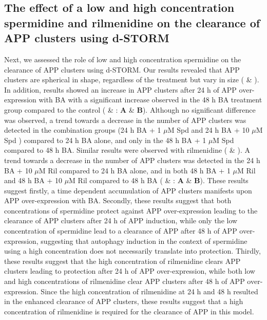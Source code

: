 \subsection{The effect of a low and high concentration spermidine and rilmenidine on the clearance of APP clusters using d-STORM}

Next, we assessed the role of low and high concentration spermidine on the clearance of APP clusters using d-STORM. Our results revealed that APP clusters are spherical in shape, regardless of the treatment but vary in size ( \& ). In addition, results showed an increase in APP clusters after 24 h of APP over-expression with BA with a significant increase observed in the 48 h BA treatment group compared to the control ( \& : \textbf{A} \& \textbf{B}). Although no significant difference was observed, a trend towards a decrease in the number of APP clusters was detected in the combination groups (24 h BA + 1 $\mu$M Spd and 24 h BA + 10 $\mu$M Spd ) compared to 24 h BA alone, and only in the 48 h BA + 1 $\mu$M Spd compared to 48 h BA. Similar results were observed with rilmenidine ( \& ). A trend towards a decrease in the number of APP clusters was detected in the 24 h BA + 10  $\mu$M Ril compared to 24 h BA alone, and in both 48 h BA + 1  $\mu$M Ril and 48 h BA + 10  $\mu$M Ril compared to 48 h BA ( \& : \textbf{A} \& \textbf{B}). These results suggest firstly, a time dependent accumulation of APP clusters manifests upon APP over-expression with BA. Secondly, these results suggest that both concentrations of spermidine protect against APP over-expression leading to the clearance of APP clusters after 24 h of APP induction, while only the low concentration of spermidine lead to a clearance of APP after 48 h of APP over-expression, suggesting that autophagy induction in the context of spermidine using a high concentration does not necessarily translate into protection. Thirdly, these results suggest that the high concentration of rilmenidine clears APP clusters leading to protection after 24 h of APP over-expression, while both low and high concentrations of rilmenidine clear APP clusters after 48 h of APP over-expression. Since the high concentration of rilmenidine at 24 h and 48 h resulted in the enhanced clearance of APP clusters, these results suggest that a high concentration of rilmenidine is required for the clearance of APP in this model. 

